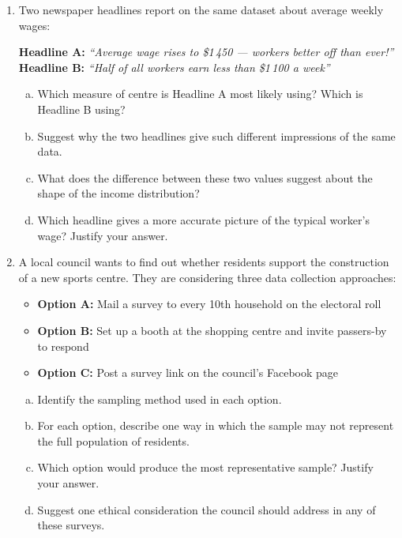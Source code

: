 \documentclass{article}
\begin{document}
\begin{enumerate}
  \item Two newspaper headlines report on the same dataset about average weekly wages:
  \begin{center}
    \textbf{Headline A:} \textit{``Average wage rises to \$1\,450 --- workers better off than
    ever!''}\\[6pt]
    \textbf{Headline B:} \textit{``Half of all workers earn less than \$1\,100 a week''}
  \end{center}
  \begin{enumerate}[(a)]
    \item Which measure of centre is Headline A most likely using? Which is Headline B using?
    \item Suggest why the two headlines give such different impressions of the same data.
    \item What does the difference between these two values suggest about the shape of the
    income distribution?
    \item Which headline gives a more accurate picture of the typical worker's wage? Justify
    your answer.
  \end{enumerate}

  \item A local council wants to find out whether residents support the construction of a new
  sports centre. They are considering three data collection approaches:
  \begin{itemize}
    \item \textbf{Option A:} Mail a survey to every 10th household on the electoral roll
    \item \textbf{Option B:} Set up a booth at the shopping centre and invite passers-by to
    respond
    \item \textbf{Option C:} Post a survey link on the council's Facebook page
  \end{itemize}
  \begin{enumerate}[(a)]
    \item Identify the sampling method used in each option.
    \item For each option, describe one way in which the sample may not represent the full
    population of residents.
    \item Which option would produce the most representative sample? Justify your answer.
    \item Suggest one ethical consideration the council should address in any of these surveys.
  \end{enumerate}


\end{enumerate}
\end{document}
